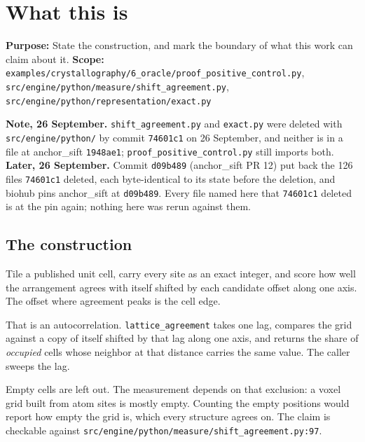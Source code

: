 \chapter{What this is}

\textbf{Purpose:} State the construction, and mark the boundary of what this work can claim about it.
\textbf{Scope:} \texttt{examples/\allowbreak{}crystallography/\allowbreak{}6\_\allowbreak{}oracle/\allowbreak{}proof\_\allowbreak{}positive\_\allowbreak{}control.\allowbreak{}py}, \texttt{src/\allowbreak{}engine/\allowbreak{}python/\allowbreak{}measure/\allowbreak{}shift\_\allowbreak{}agreement.\allowbreak{}py}, \texttt{src/\allowbreak{}engine/\allowbreak{}python/\allowbreak{}representation/\allowbreak{}exact.\allowbreak{}py}

\textbf{Note, 26 September.} \texttt{shift\_\allowbreak{}agreement.\allowbreak{}py} and \texttt{exact.\allowbreak{}py} were deleted with \texttt{src/\allowbreak{}engine/\allowbreak{}python/} by commit \texttt{74601c1} on 26 September, and neither is in a file at anchor\_sift \texttt{1948ae1}; \texttt{proof\_\allowbreak{}positive\_\allowbreak{}control.\allowbreak{}py} still imports both. \textbf{Later, 26 September.} Commit \texttt{d09b489} (anchor\_sift PR 12) put back the 126 files \texttt{74601c1} deleted, each byte-identical to its state before the deletion, and biohub pins anchor\_sift at \texttt{d09b489}. Every file named here that \texttt{74601c1} deleted is at the pin again; nothing here was rerun against them.

\section{The construction}

Tile a published unit cell, carry every site as an exact integer, and score how well the arrangement agrees with itself shifted by each candidate offset along one axis. The offset where agreement peaks is the cell edge.

That is an autocorrelation. \texttt{lattice\_\allowbreak{}agreement} takes one lag, compares the grid against a copy of itself shifted by that lag along one axis, and returns the share of \emph{occupied} cells whose neighbor at that distance carries the same value. The caller sweeps the lag.

Empty cells are left out. The measurement depends on that exclusion: a voxel grid built from atom sites is mostly empty. Counting the empty positions would report how empty the grid is, which every structure agrees on. The claim is checkable against \texttt{src/\allowbreak{}engine/\allowbreak{}python/\allowbreak{}measure/\allowbreak{}shift\_\allowbreak{}agreement.\allowbreak{}py:97}.

